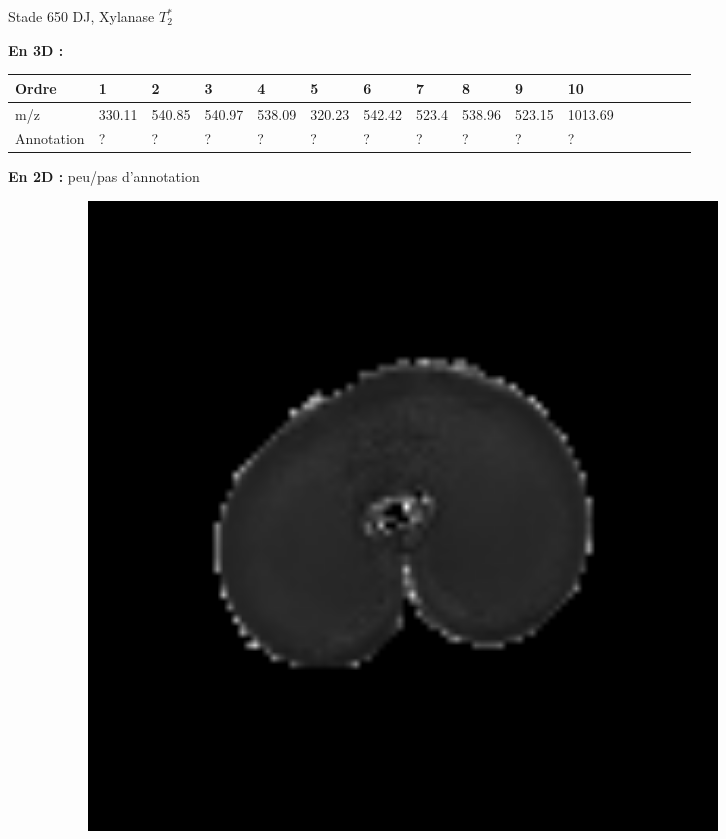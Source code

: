 \documentclass[10pt]{beamer}
\begin{document}
\begin{frame}{Stade 650 DJ, Xylanase}
  \textbf{$T_2^*$}
  
  \textbf{En 3D :}
  \vspace{-0.4cm}
    \begin{table}[]
    \centering
    \begin{adjustbox}{max width=1\textwidth}
      \begin{tabular}{llllllllllllllll}
        \toprule
        Ordre & 1       & 2       & 3       & 4       & 5       & 6       & 7       & 8       & 9       & 10       \\
        \midrule
        m/z &    330.11 & 540.85 & 540.97 & 538.09 & 320.23 & 542.42 & 523.4 & 538.96 & 523.15 & 1013.69 \\
        Annotation &  ? & ? & ? & ? & ? & ? & ? & ?  & ? & ?\\
        \bottomrule
      \end{tabular}
    \end{adjustbox}
  \end{table}




  \textbf{En 2D :} peu/pas d'annotation

  \begin{figure}[ht]
    \centering
    \begin{subfigure}[t]{0.33\textwidth}
      \centering
      \includegraphics[width=0.9\textwidth]{fig/stats_650Lich_t2_irm}


\end{subfigure}
\end{figure}
\end{frame}
\end{document}
